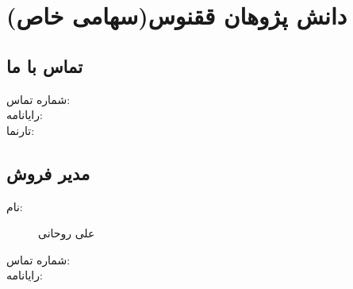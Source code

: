 % 
% 
% 

%
% 
% 
%

\section{دانش پژوهان ققنوس(سهامی خاص)}

\subsection{تماس با ما}

\begin{description}
\item[شماره تماس:] 
\item[رایانامه:] 
\item[تارنما:] 
\end{description}

\subsection{مدیر فروش}

\begin{description}
\item[نام:] علی روحانی
\item[شماره تماس:] 
\item[رایانامه:] 
\end{description}
